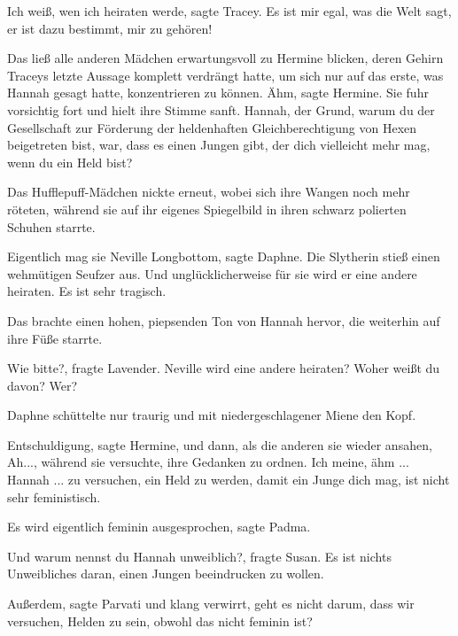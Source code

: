 \glqq Ich weiß, wen ich heiraten werde\grqq{}, sagte Tracey. \glqq Es ist mir
egal, was die Welt sagt, er ist dazu bestimmt, mir zu gehören!\grqq{}

Das ließ alle anderen Mädchen erwartungsvoll zu Hermine blicken, deren Gehirn
Traceys letzte Aussage komplett verdrängt hatte, um sich nur auf das erste, was
Hannah gesagt hatte, konzentrieren zu können. \glqq Ähm\grqq{}, sagte Hermine.
Sie fuhr vorsichtig fort und hielt ihre Stimme sanft. \glqq Hannah, der Grund,
warum du der Gesellschaft zur Förderung der heldenhaften Gleichberechtigung von
Hexen beigetreten bist, war, dass es einen Jungen gibt, der dich vielleicht mehr
mag, wenn du ein Held bist?\grqq{}

Das Hufflepuff-Mädchen nickte erneut, wobei sich ihre Wangen noch mehr röteten,
während sie auf ihr eigenes Spiegelbild in ihren schwarz polierten Schuhen
starrte.

\glqq Eigentlich mag sie Neville Longbottom\grqq{}, sagte Daphne. Die Slytherin
stieß einen wehmütigen Seufzer aus. \glqq Und unglücklicherweise für sie wird er
eine andere heiraten. Es ist sehr tragisch.\grqq{}

Das brachte einen hohen, piepsenden Ton von Hannah hervor, die weiterhin auf
ihre Füße starrte.

\glqq Wie bitte?\grqq{}, fragte Lavender. \glqq Neville wird eine andere
heiraten? Woher weißt du davon? Wer?\grqq{}

Daphne schüttelte nur traurig und mit niedergeschlagener Miene den Kopf.

\glqq Entschuldigung\grqq{}, sagte Hermine, und dann, als die anderen sie wieder
ansahen, \glqq Ah...\grqq{}, während sie versuchte, ihre Gedanken zu ordnen.
\glqq Ich meine, ähm ... Hannah ... zu versuchen, ein Held zu werden, damit ein
Junge dich mag, ist nicht sehr feministisch.\grqq{}

\glqq Es wird eigentlich feminin ausgesprochen\grqq{}, sagte Padma.

\glqq Und warum nennst du Hannah unweiblich?\grqq{}, fragte Susan. \glqq Es ist
nichts Unweibliches daran, einen Jungen beeindrucken zu wollen.\grqq{}

\glqq Außerdem\grqq{}, sagte Parvati und klang verwirrt, \glqq geht es nicht
darum, dass wir versuchen, Helden zu sein, obwohl das nicht feminin ist?\grqq{}

